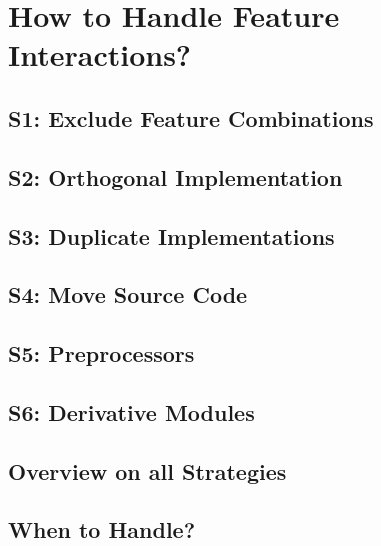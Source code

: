 \documentclass[
	aspectratio=169, %
	8pt, %
	handout, %
]{beamer}
\begin{document}
\lessonslearned{
	\item \ldots
}{
	\item \ldots
}{
	\ldots
}

\sectionend

\section{How to Handle Feature Interactions?}

\subsection{S1: Exclude Feature Combinations}
\subsection{S2: Orthogonal Implementation}
\subsection{S3: Duplicate Implementations}
\subsection{S4: Move Source Code}
\subsection{S5: Preprocessors}
\subsection{S6: Derivative Modules}
\subsection{Overview on all Strategies}
\subsection{When to Handle?}

%

\lessonslearned{
	\item \ldots
}{
	\item \ldots
}{
	\ldots
}
\end{document}
